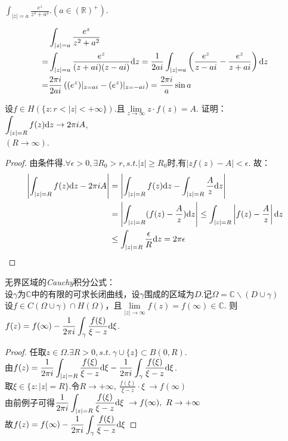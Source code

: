 \begin{eg}
	$\displaystyle{\int_{|z|=a}\frac{e^z}{z^2+a^2}.(a\in\mathbb{(R)^+})}$.
\end{eg}
\begin{jie}
	\begin{align*}
	&\int_{|z|=a}\frac{e^z}{z^2+a^2}\\
	=&\int_{|z|=a}\frac{e^z}{(z+ai)(z-ai)}\mathrm{d}z=\frac{1}{2ai}\int_{|z|=a}\left(\frac{e^z}{z-ai}-\frac{e^z}{z+ai}\right)\mathrm{d}z\\
	=&\frac{2\pi i}{2ai}\left((e^z)|_{z=ai}-(e^z)|_{z=-ai}\right)=\frac{2\pi i}{a}\sin a
	\end{align*}
\end{jie}

\begin{eg}
	设$f\in H(\{z:r<|z|<+\infty\})$.且$\lim\limits_{z\rightarrow\infty}z\cdot f(z)=A$.
	证明：$\displaystyle{\int_{|z|=R}f(z)\mathrm{d}z\rightarrow 2\pi iA}$,\\$(R\rightarrow\infty)$.
\end{eg}
\begin{proof}
	由条件得.$\forall\epsilon>0,\exists R_0>r,s.t.|z|\geq R_0$时,有$|zf(z)-A|<\epsilon$.
	故：
	\begin{align*}
	\left|\int_{|z|=R}f(z)\mathrm{d}z-2\pi iA\right|
	&=\left|\int_{|z|=R}f(z)\mathrm{d}z-\int_{|z|=R}\frac{A}{z}\mathrm{d}z\right|\\
	&=\left|\int_{|z|=R}(f(z)-\frac{A}{z})\mathrm{d}z\right|\leq\int_{|z|=R}\left|f(z)-\frac{A}{z}\right|\mathrm{d}z\\
	&\leq\int_{|z|=R}\frac{\epsilon}{R}\mathrm{d}z=2\pi\epsilon
	\end{align*}
\end{proof}
\begin{eg}
	无界区域的\emph{Cauchy}积分公式：\\
	设$\gamma$为$\mathbb{C}$中的有限的可求长闭曲线，设$\gamma$围成的区域为$D$.记$\Omega=\mathbb{C}\backslash(D\cup \gamma)$\\
	设$f\in C(\Omega\cup \gamma)\cap H(\Omega)$，且$\lim\limits_{|z|\rightarrow\infty}f(z)=f(\infty)\in\mathbb{C}$.
	则$\displaystyle{f(z)=f(\infty)-\frac{1}{2\pi i}\int_{\gamma}\frac{f(\xi)}{\xi-z}\mathrm{d}\xi}$.
\end{eg}
\begin{proof}
	任取$\displaystyle{z\in\Omega.\exists R>0,s.t.\ \gamma\cup\{z\}\subset B(0,R)}$.\\
	由$\displaystyle{f(z)=\frac{1}{2\pi i}\int_{|z|=R}\frac{f(\xi)}{\xi-z}\mathrm{d}\xi-\frac{1}{2\pi i}\int_{\gamma}\frac{f(\xi)}{\xi-z}\mathrm{d}\xi}$.\\
	取$\displaystyle{\xi\in\{z:|z|=R\}}$.令$\displaystyle{R\rightarrow+\infty,\ \frac{f(\xi)}{\xi-z}\cdot\xi\ \rightarrow f(\infty)}$\\
	由前例子可得$\displaystyle{\frac{1}{2\pi i}\int_{|z|=R}\frac{f(\xi)}{\xi-z}\di{\xi}\ \rightarrow f(\infty),\ R\rightarrow+\infty}$\\
	故$\displaystyle{f(z)=f(\infty)-\frac{1}{2\pi i}\int_\gamma\frac{f(\xi)}{\xi-z}\mathrm{d}\xi}$
\end{proof}


